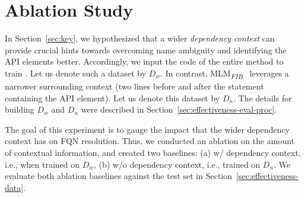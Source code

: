 \section*{Ablation Study}
\label{sec:ablation}

In Section~\ref{sec:key}, we hypothesized that a wider {\em dependency
  context} can provide crucial hints towards overcoming name ambiguity
and identifying the API elements better. Accordingly, we input the
code of the entire method to train {\tool}. Let us denote such a
dataset by $D_w$. In contrast,
MLM\textsubscript{\textit{FIB}}~\cite{prompt-ase22} leverages a
narrower surrounding context (two lines before and after the statement
containing the API element). Let us denote this dataset by $D_n$. The
details for building $D_w$ and $D_n$ were described in
Section~\ref{sec:effectiveness-eval-proc}.

The goal of this experiment is to gauge the impact that the wider
dependency context has on FQN resolution. Thus, we conducted an
ablation on the amount of contextual information, and created two
baselines: (a) \tool w/ dependency context, i.e., when trained on
$D_w$, (b) \tool w/o dependency context, i.e., trained on $D_n$. We
evaluate both ablation baselines against the test set in
Section~\ref{sec:effectiveness-data}.


